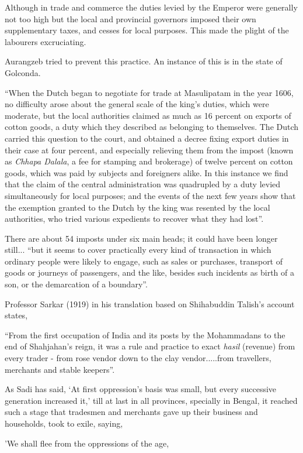 Although in trade and commerce the duties levied by the Emperor were generally not too high but the local and provincial governors imposed their own supplementary taxes, and cesses for local purposes. This made the plight of the labourers excruciating.

Aurangzeb tried to prevent this practice. An instance of this is in the state of Golconda. 

“When the Dutch began to negotiate for trade at Masulipatam in the year 1606, no difficulty arose about the general scale of the king’s duties, which were moderate, but the local authorities claimed as much as 16 percent on exports of cotton goods, a duty which they described as belonging to themselves. The Dutch carried this question to the court, and obtained a decree fixing export duties in their case at four percent, and especially relieving them from the impost (known as {\it Chhapa Dalala}, a fee for stamping and brokerage) of twelve percent on cotton goods, which was paid by subjects and foreigners alike. In this instance we find that the claim of the central administration was quadrupled by a duty levied simultaneously for local purposes; and the events of the next few years show that the exemption granted to the Dutch by the king was resented by the local authorities, who tried various expedients to recover what they had lost”.

There are about 54 imposts under six main heads; it could have been longer still... “but it seems to cover practically every kind of transaction in which ordinary people were likely to engage, such as sales or purchases, transport of goods or journeys of passengers, and the like, besides such incidents as birth of a son, or the demarcation of a boundary”.

Professor Sarkar (1919) in his translation based on Shihabuddin Talish’s account states, 

“From the first occupation of India and its posts by the Mohammadans to the end of Shahjahan's reign, it was a rule and practice to exact {\it hasil} (revenue) from every trader - from rose vendor down to the clay vendor.....from travellers, merchants and stable keepers”.  

As Sadi has said, ‘At first oppression's basis was small, but every successive generation increased it,’ till at last in all provinces, specially in Bengal, it reached such a stage that tradesmen and merchants gave up their business and households, took to exile, saying,  

'We shall flee from the oppressions of the age,


